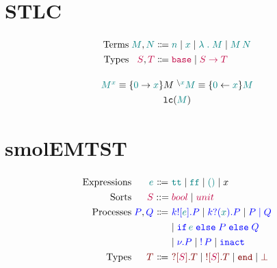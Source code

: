 \documentclass{article}
\begin{document}
\section{STLC}

\begin{displaymath}
  \arraycolsep=1.4pt\def\arraystretch{1.3}
  \begin{array}{rrcl}
    \text{Terms} & \dexp M, \dexp N & \bnfas & \bvar n \bnfalt \fvar x \bnfalt \lam M \bnfalt \app M N\\
    \text{Types} & \dte S, \dte T & \bnfas & \base \bnfalt \arr S T\\
  \end{array}
\end{displaymath}


\begin{displaymath}
  \arraycolsep=1.4pt\def\arraystretch{1.3}
  \begin{array}{cc}
    \openop {\dexp M} {\vex x} \equiv \{\vex 0 \rightarrow \vex x\} M & \closeop {\dexp M} {\vex x} \equiv \{\vex 0 \leftarrow \vex x\} \dexp M \\
    \multicolumn{2}{c}{\lclosed {\dexp M}}\\
  \end{array}
\end{displaymath}



\section{smolEMTST}

\begin{displaymath}
  \arraycolsep=1.4pt\def\arraystretch{1.3}
  \begin{array}{rrcl}
    \text{Expressions} & \dexp{e} & \bnfas & \ett \bnfalt \eff \bnfalt \eone \bnfalt x\\
    \text{Sorts} & \dte{S} & \mathrel{::=} & \tbool \bnfalt \tunit \\

    \text{Processes} & \dproc{P}, \dproc{Q} & \bnfas & \psend k e P \bnfalt \precv k x P \bnfalt \ppar P Q\\
    & & & \bnfalt \pif e P Q \\
    & & & \bnfalt \pnu P \bnfalt \pbang P \bnfalt \pinact\\
    \text{Types} & \dst{T} & \bnfas & \tin S T \bnfalt \tout S T \bnfalt \tend \bnfalt \tbot\\
  \end{array}
\end{displaymath}
\end{document}
